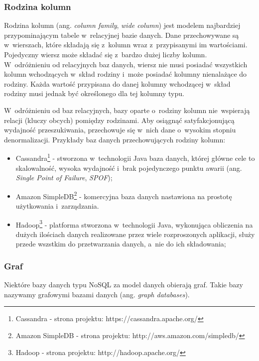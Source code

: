 \subsubsection{Rodzina kolumn} \label{sec:column_family}

Rodzina kolumn (ang. \emph{column family}, \emph{wide column}) jest modelem najbardziej przypominającym tabele w~relacyjnej bazie danych.
Dane przechowywane są w~wierszach, które składają się z~kolumn wraz z~przypisanymi im wartościami.
Pojedyczny wiersz może składać się z~bardzo dużej liczby kolumn.
W~odróżnieniu od relacyjnych baz danych, wiersz nie musi posiadać wszystkich kolumn wchodzących w~skład rodziny i~może posiadać kolumny nienalażące do rodziny.
Każda wartość przypisana do danej kolumny wchodzącej w~skład rodziny musi jednak być określonego dla tej kolumny typu.

W~odróżnieniu od baz relacyjnych, bazy oparte o~rodziny kolumn nie~wspierają relacji (kluczy obcych) pomiędzy rodzinami.
Aby osiągnąć satyfakcjonującą wydajność przeszukiwania, przechowuje się w~nich dane o~wysokim stopniu denormalizacji.
Przykłady baz danych przechowujących rodziny kolumn:

\begin{itemize}
 \item Cassandra\footnote{Cassandra - strona projektu: https://cassandra.apache.org/} - stworzona w~technologii Java baza danych, której główne cele to skalowalność, wysoka wydajność i~brak pojedynczego punktu awarii (ang. \emph{Single Point of Failure}, \emph{SPOF});
 \item Amazon SimpleDB\footnote{Amazon SimpleDB - strona projektu: http://aws.amazon.com/simpledb/} - komercyjna baza danych nastawiona na prostotę użytkowania i~zarządzania.
 \item Hadoop\footnote{Hadoop - strona projektu: http://hadoop.apache.org/} - platforma stworzona w~technologii Java, wykonująca obliczenia na dużych ilościach danych realizowane przez wiele rozproszonych aplikacji, służy przede wszstkim do przetwarzania danych, a~nie do ich składowania;
\end{itemize}

\subsubsection{Graf}

Niektóre bazy danych typu NoSQL za model danych obierają graf.
Takie bazy nazywamy grafowymi bazami danych (ang. \emph{graph databases}).

